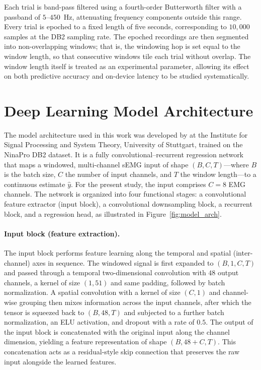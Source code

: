 \documentclass[12pt,DIV16,BCOR12mm,a4paper,footinclude=false,headinclude,parskip=half-,twoside,openright,cleardoublepage=empty,toc=index,bibliography=totoc,listof=totoc]{scrreprt}
\numberwithin{equation}{chapter}
\begin{document}
  Each trial is band-pass filtered using a fourth-order Butterworth filter with a
  passband of $5$--$450$~Hz, attenuating frequency components outside this range. 
  Every trial is epoched to a fixed length of five seconds, corresponding to $10{,}000$
  samples at the DB2 sampling rate. The epoched recordings are then segmented into
  non-overlapping windows; that is, the windowing hop is set equal to the window
  length, so that consecutive windows tile each trial without overlap. The window
  length itself is treated as an experimental parameter, allowing its effect on both
  predictive accuracy and on-device latency to be studied systematically.

  \section{Deep Learning Model Architecture}

  The model architecture used in this work was developed by \cite{jonasPrePrint} at the
  Institute for Signal Processing and System Theory, University of Stuttgart,
  trained on the NinaPro DB2 dataset. It is a fully convolutional--recurrent
  regression network that maps a windowed, multi-channel sEMG input of shape
  $(B, C, T)$---where $B$ is the batch size, $C$ the number of input channels, and
  $T$ the window length---to a continuous estimate $\hat{y}$. For the present study,
  the input comprises $C = 8$ EMG channels. The network is organized into four
  functional stages: a convolutional feature extractor (input block), a
  convolutional downsampling block, a recurrent block, and a regression head, as
  illustrated in Figure~\ref{fig:model_arch}.

  \paragraph{Input block (feature extraction).}
  The input block performs feature learning along the temporal and spatial
  (inter-channel) axes in sequence. The windowed signal is first expanded to
  $(B, 1, C, T)$ and passed through a temporal two-dimensional convolution with
  $48$ output channels, a kernel of size $(1, 51)$ and same padding, followed by
  batch normalization. A spatial convolution with a kernel of size $(C, 1)$ and
  channel-wise grouping then mixes information across the input channels, after
  which the tensor is squeezed back to $(B, 48, T)$ and subjected to a further batch
  normalization, an ELU activation, and dropout with a rate of $0.5$. The output of
  the input block is concatenated with the original input along the channel
  dimension, yielding a feature representation of shape $(B, 48 + C, T)$. This
  concatenation acts as a residual-style skip connection that preserves the raw
  input alongside the learned features.
\end{document}
